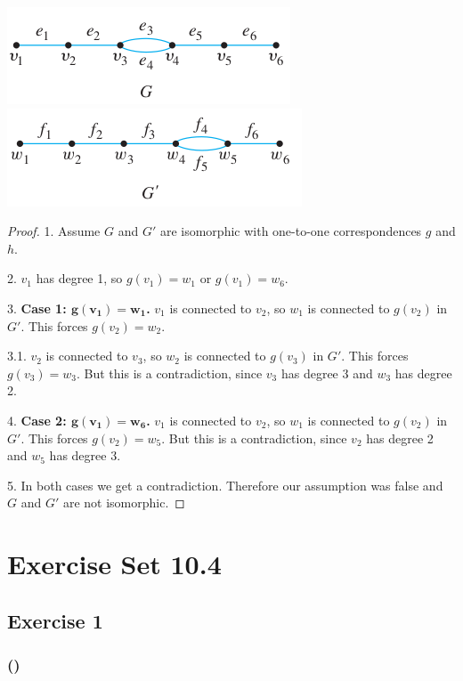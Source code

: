 \documentclass[14pt]{extarticle}
\begin{document}
\includegraphics[scale=0.7]{../images/10.3.30.1.png} \includegraphics[scale=0.7]{../images/10.3.30.2.png}

\begin{proof}
1. Assume \(G\) and \(G'\) are isomorphic with one-to-one correspondences \(g\) and \(h\).

2. \(v_1\) has degree 1, so \(g(v_1) = w_1\) or \(g(v_1) = w_6\).

3. {\bf Case 1: \(\bm{g(v_1) = w_1}\).} \(v_1\) is connected to \(v_2\), so \(w_1\) is connected to \(g(v_2)\) in \(G'\).
This forces \(g(v_2) = w_2\).

3.1. \(v_2\) is connected to \(v_3\), so \(w_2\) is connected to \(g(v_3)\) in \(G'\). This forces \(g(v_3) = w_3\). But 
this is a contradiction, since \(v_3\) has degree 3 and \(w_3\) has degree 2.

4. {\bf Case 2: \(\bm{g(v_1) = w_6}\).} \(v_1\) is connected to \(v_2\), so \(w_1\) is connected to \(g(v_2)\) in \(G'\).
This forces \(g(v_2) = w_5\). But this is a contradiction, since \(v_2\) has degree 2 and \(w_5\) has degree 3.

5. In both cases we get a contradiction. Therefore our assumption was false and \(G\) and \(G'\) are not isomorphic.
\end{proof}

\section{Exercise Set 10.4}
\subsection{Exercise 1}

\subsubsection{()}
\end{document}
